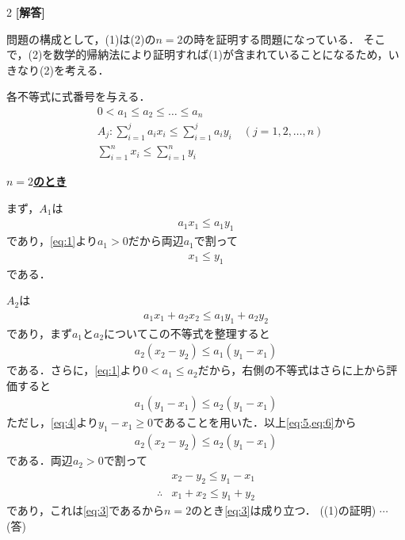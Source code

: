 \documentclass[../../main.tex]{subfiles}
\begin{document}
\setcounter{equation}{0}
\setcounter{figure}{0}
\setcounter{table}{0}
\begin{oframed}
  
\end{oframed}
\setlength{\columnseprule}{0.4pt}
\begin{multicols}{2}
  {\bf [解答]}

  問題の構成として，(1)は(2)の$n=2$の時を証明する問題になっている．
  そこで，(2)を数学的帰納法により証明すれば(1)が含まれていることになるため，いきなり(2)を考える．

  各不等式に式番号を与える．
  \begin{align}
    & 0 < a_1 \le a_2 \le \dots \le a_n                                          \label{eq:1}  \\
    & A_j: \sum_{i=1}^j a_i x_i \le \sum_{i=1}^j a_i y_i \quad (j=1, 2, \dots, n) \label{eq:2} \\
    & \sum_{i=1}^n x_i \le \sum_{i=1}^n y_i \label{eq:3}
  \end{align}

  \underline{\textbf{$n=2$のとき}}

  まず，$A_1$は
  \begin{align}
    a_1x_1 \le a_1y_1
  \end{align}
  であり，\cref{eq:1}より$a_1>0$だから両辺$a_1$で割って
  \begin{align}
    x_1 \le y_1 \label{eq:4}
  \end{align}
  である．

  $A_2$は
  \begin{align}
    a_1x_1+a_2x_2 \le a_1y_1+a_2y_2
  \end{align}
  であり，まず$a_1$と$a_2$についてこの不等式を整理すると
  \begin{align}
    a_2\left(x_2-y_2\right) \le a_1\left(y_1-x_1\right) \label{eq:5}
  \end{align}
  である．さらに，\cref{eq:1}より$0<a_1\le a_2$だから，右側の不等式はさらに上から評価すると
  \begin{align}
    a_1\left(y_1-x_1\right) \le a_2 \left(y_1-x_1\right) \label{eq:6}
  \end{align}
  ただし，\cref{eq:4}より$y_1-x_1\ge 0$であることを用いた．以上\cref{eq:5,eq:6}から
  \begin{align}
    a_2\left(x_2-y_2\right) \le a_2 \left(y_1-x_1\right)
  \end{align}
  である．両辺$a_2>0$で割って
  \begin{align}
    & x_2-y_2 \le y_1-x_1 \\
    \therefore
    & x_1+x_2 \le y_1+y_2
  \end{align}
  であり，これは\cref{eq:3}であるから$n=2$のとき\cref{eq:3}は成り立つ．
  ((1)の証明)  $\cdots$(答)


\end{multicols}
\end{document}
